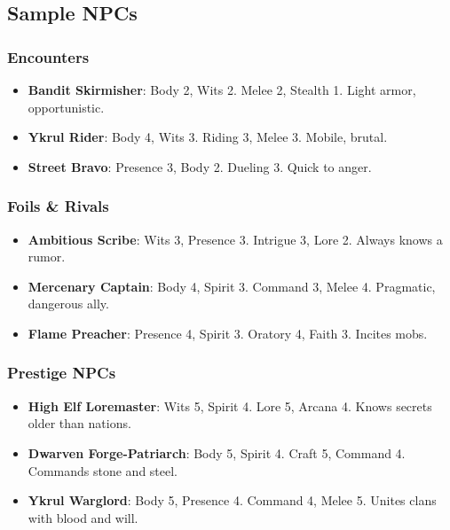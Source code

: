 \subsection*{Sample NPCs}

\subsubsection*{Encounters}

\begin{itemize}
    \item \textbf{Bandit Skirmisher}: Body 2, Wits 2. Melee 2, Stealth 1. Light armor, opportunistic.
    \item \textbf{Ykrul Rider}: Body 4, Wits 3. Riding 3, Melee 3. Mobile, brutal.
    \item \textbf{Street Bravo}: Presence 3, Body 2. Dueling 3. Quick to anger.
\end{itemize}

\subsubsection*{Foils \& Rivals}

\begin{itemize}
    \item \textbf{Ambitious Scribe}: Wits 3, Presence 3. Intrigue 3, Lore 2. Always knows a rumor.
    \item \textbf{Mercenary Captain}: Body 4, Spirit 3. Command 3, Melee 4. Pragmatic, dangerous ally.
    \item \textbf{Flame Preacher}: Presence 4, Spirit 3. Oratory 4, Faith 3. Incites mobs.
\end{itemize}

\subsubsection*{Prestige NPCs}

\begin{itemize}
    \item \textbf{High Elf Loremaster}: Wits 5, Spirit 4. Lore 5, Arcana 4. Knows secrets older than nations.
    \item \textbf{Dwarven Forge-Patriarch}: Body 5, Spirit 4. Craft 5, Command 4. Commands stone and steel.
    \item \textbf{Ykrul Warglord}: Body 5, Presence 4. Command 4, Melee 5. Unites clans with blood and will.
\end{itemize}

